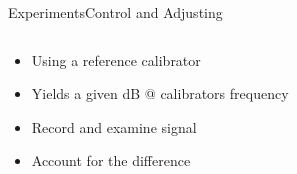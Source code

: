 \begin{frame}{Experiments}{Control and Adjusting}		
	\begin{columns}
		\begin{column}{0.3\textwidth}
			\begin{itemize}
				\item Using a reference calibrator
				\item Yields a given dB @ calibrators frequency
				\item Record and examine signal
				\item Account for the difference 
			\end{itemize}	
		\end{column}	
		\begin{column}{0.7\textwidth} 
			\begin{figure}
				
			\end{figure}
		\end{column}
	\end{columns}
\end{frame}

